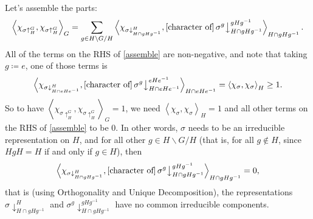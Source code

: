 \documentclass[12pt]{article}
\newcommand\inv[1]{#1^{-1}}
\newcommand{\vbrack}[1]{\left \langle #1 \right \rangle}
\theoremstyle{definition}
\begin{document}
Let's assemble the parts: 
\begin{equation}\label{assemble}
    \vbrack{ \chi_{\sigma\uparrow_H^G} , \chi_{\sigma\uparrow_H^G} }_G = \sum\limits_{g \in H \backslash G / H} \vbrack{ \chi_{\sigma \downarrow^H_{H \cap g H \inv{g}} } , \left[ \text{character of} \right] \sigma^g \big\downarrow^{g H \inv{g}}_{H \cap g H \inv{g}} }_{H \cap g H \inv{g}}.
\end{equation}
All of the terms on the RHS of \eqref{assemble} are non-negative, and note that taking $g \coloneqq  e$, one of those terms is 
\begin{equation}
    \vbrack{ \chi_{\sigma \downarrow^H_{H \cap e H \inv{e}} } , \left[ \text{character of} \right] \sigma^g \big\downarrow^{e H \inv{e}}_{H \cap e H \inv{e}} }_{H \cap e H \inv{e}} = \vbrack{ \chi_{\sigma} , \chi_{\sigma} }_H \geq 1.
\end{equation}
So to have $\vbrack{ \chi_{\sigma\uparrow_H^G} , \chi_{\sigma\uparrow_H^G} }_G = 1$, we need $\vbrack{ \chi_{\sigma} , \chi_{\sigma} }_H = 1$ and all other terms on the RHS of \eqref{assemble} to be 0. In other words, $\sigma$ needs to be an irreducible representation on $H$, and for all other $g \in H \backslash G / H$ (that is, for all $g \notin H$, since $HgH = H$ if and only if $g \in H$), then 
\begin{equation}
    \vbrack{ \chi_{\sigma \downarrow^H_{H \cap g H \inv{g}} } , \left[ \text{character of} \right] \sigma^g \big\downarrow^{g H \inv{g}}_{H \cap g H \inv{g}} }_{H \cap g H \inv{g}} = 0,
\end{equation}
that is (using Orthogonality and Unique Decomposition), the representations $\sigma\downarrow^H_{H \cap g H \inv{g}}$ and $\sigma^g \downarrow^{g H \inv{g}}_{H \cap g H \inv{g}}$ have no common irreducible components. 
\end{document}
